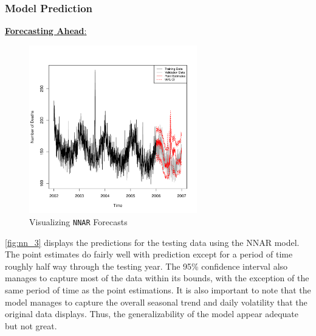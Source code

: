 \documentclass{article}\usepackage[]{graphicx}\usepackage[]{color}
\newenvironment{knitrout}{}{} %
\begin{document}
\subsubsection*{Model Prediction}
\noindent\underline{\textbf{Forecasting Ahead}:}
\vspace{-20 pt}
\begin{knitrout}
\color{fgcolor}\begin{figure}[H]

{\centering \includegraphics[width=0.65\textwidth]{figure/nn_3-1} 

}

\caption[Visualizing \texttt{NNAR} Forecasts]{Visualizing \texttt{NNAR} Forecasts}\label{fig:nn_3}
\end{figure}


\end{knitrout}

\autoref{fig:nn_3} displays the predictions for the testing data using the NNAR model. The point estimates do fairly well with prediction except for a period of time roughly half way through the testing year. The 95\% confidence interval also manages to capture most of the data within its bounds, with the exception of the same period of time as the point estimations. It is also important to note that the model manages to capture the overall seasonal trend and daily volatility that the original data displays. Thus, the generalizability of the model appear adequate but not great.
\end{document}
